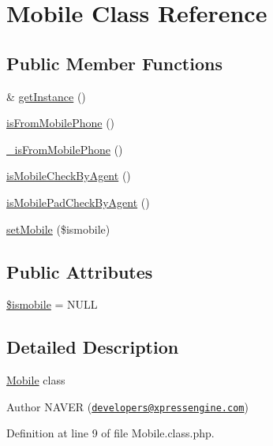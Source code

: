 \hypertarget{classMobile}{\section{Mobile Class Reference}
\label{classMobile}
}
\subsection*{Public Member Functions}
\begin{DoxyCompactItemize}
\item 
\& \hyperlink{classMobile_a303f0bf07eb32a56769009c12c70d954}{get\+Instance} ()
\item 
\hyperlink{classMobile_a9978671e8463a94130a6733f2d0fa0a4}{is\+From\+Mobile\+Phone} ()
\item 
\hyperlink{classMobile_a5f539dee62a4a3e83db1df0f2d9573e4}{\+\_\+is\+From\+Mobile\+Phone} ()
\item 
\hyperlink{classMobile_a58dde3c19008fb6fff64140c0b34a5ee}{is\+Mobile\+Check\+By\+Agent} ()
\item 
\hyperlink{classMobile_a137e8bae3e1f34b018864d2df624113f}{is\+Mobile\+Pad\+Check\+By\+Agent} ()
\item 
\hyperlink{classMobile_a82db2bb3415147c24d429bb065542053}{set\+Mobile} (\$ismobile)
\end{DoxyCompactItemize}
\subsection*{Public Attributes}
\begin{DoxyCompactItemize}
\item 
\hyperlink{classMobile_a321b198b13267ac948fb78b6dc09de4e}{\$ismobile} = N\+U\+L\+L
\end{DoxyCompactItemize}


\subsection{Detailed Description}
\hyperlink{classMobile}{Mobile} class

\begin{DoxyAuthor}{Author}
N\+A\+V\+E\+R (\href{mailto:developers@xpressengine.com}{\tt developers@xpressengine.\+com}) 
\end{DoxyAuthor}


Definition at line 9 of file Mobile.\+class.\+php.



